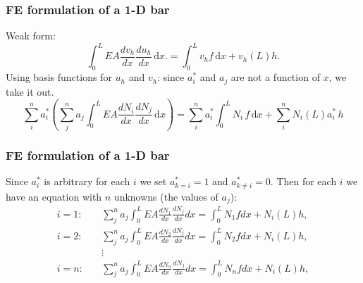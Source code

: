 \documentclass[notes]{beamer}
\begin{document}
\begin{frame}
\frametitle{FE formulation of a 1-D bar}
Weak form:
\begin{equation*}
\int_0^L EA \frac{dv_h}{dx} \frac{du_h}{dx}\, \mathrm{d}x. = \int_0^L v_h f\, \mathrm{d}x + v_h(L)h.
\end{equation*}
Using basis functions for $u_h$ and $v_h$:
since $a_i^*$  and $a_j$ are not a function of $x$, we take it out.
\begin{equation*}
	\sum_i^n a_i^* \left(\sum_j^n a_j \int_0^L EA \frac{dN_i}{dx}\frac{dN_j}{dx}\, \mathrm{d}x \right)  = \sum_i^n a_i^* \int_0^L N_i \,f\,\mathrm{d}x + \sum_i^n N_i(L) a_i^*\,h
\end{equation*}
\end{frame}


\begin{frame}
\frametitle{FE formulation of a 1-D bar}
Since $a_i^*$ is arbitrary for each $i$ we set $a_{k=i}^*=1$ and $a_{k \ne i}^*=0$. Then for each $i$ we have an equation with $n$ unknowns (the values of $a_j$):
\begin{align*}
i = 1: \quad & \sum_j^n {a_j} \int_{0}^{L}EA \frac{dN_1}{dx}\frac{dN_j}{dx} dx = \int_{0}^{L}N_1 f dx + N_i(L)h, \\
i = 2: \quad & \sum_j^n {a_j} \int_{0}^{L}EA \frac{dN_2}{dx}\frac{dN_j}{dx} dx = \int_{0}^{L}N_2 f dx + N_i(L)h, \\
\quad & \vdots \\
i = n: \quad & \sum_j^n {a_j} \int_{0}^{L}EA \frac{dN_n}{dx}\frac{dN_j}{dx} dx = \int_{0}^{L}N_n f dx + N_i(L)h,
\end{align*}
\end{frame}
\end{document}
